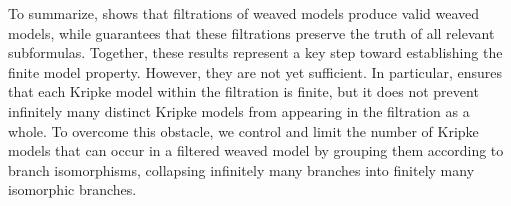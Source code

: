 To summarize,  shows that filtrations of weaved models produce valid weaved models, while  guarantees that these filtrations preserve the truth of all relevant subformulas. Together, these results represent a key step toward establishing the finite model property. However, they are not yet sufficient. In particular,  ensures that each Kripke model within the filtration is finite, but it does not prevent infinitely many distinct Kripke models from appearing in the filtration as a whole. To overcome this obstacle, we control and limit the number of Kripke models that can occur in a filtered weaved model by grouping them according to branch isomorphisms, collapsing infinitely many branches into finitely many isomorphic branches.

